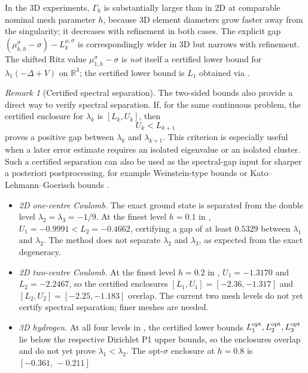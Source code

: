 \documentclass[11pt]{article}
\theoremstyle{plain}
\theoremstyle{definition}
\theoremstyle{remark}
\newtheorem{remark}{Remark}
\begin{document}
In the 3D experiments, $\Gamma_h$ is substantially larger than in 2D
at comparable nominal mesh parameter $h$, because 3D element diameters
grow faster away from the singularity; it decreases with refinement in
both cases.
The explicit gap $(\mu_{k,h}^\sigma{-}\sigma)-L_k^{\mu,\sigma}$ is
correspondingly wider in 3D but narrows with refinement.
The shifted Ritz value $\mu_{1,h}^\sigma{-}\sigma$ is
\emph{not} itself a certified lower bound for $\lambda_1(-\Delta+V)$
on $\mathbb{R}^3$; the certified lower bound is $L_1$ obtained via
.

\begin{remark}[Certified spectral separation]
\label{rmk:numerical-separation}
The two-sided bounds also provide a direct way to verify spectral
separation.  If, for the same continuous problem, the certified enclosure
for $\lambda_k$ is
$[L_k,U_k]$, then
\[
  U_k < L_{k+1}
\]
proves a positive gap between $\lambda_k$ and $\lambda_{k+1}$.  This
criterion is especially useful when a later error estimate requires an
isolated eigenvalue or an isolated cluster.  Such a certified separation
can also be used as the spectral-gap input for sharper a posteriori
postprocessing, for example Weinstein-type bounds
\cite{WeinsteinStenger1972} or Kato--Lehmann--Goerisch bounds
\cite{Kato1949,Lehmann1963,Goerisch1986,BehnkeGoerisch1994}.
\begin{itemize}
\item \emph{2D one-centre Coulomb.}
  The exact ground state is separated from the double level
  $\lambda_2=\lambda_3=-1/9$.
  At the finest level $h=0.1$ in ,
  $U_1=-0.9991<L_2=-0.4662$, certifying a gap of at least
  $0.5329$ between $\lambda_1$ and $\lambda_2$.
  The method does not separate $\lambda_2$ and $\lambda_3$,
  as expected from the exact degeneracy.
\item \emph{2D two-centre Coulomb.}
  At the finest level $h=0.2$ in ,
  $U_1=-1.3170$ and $L_2=-2.2467$, so the certified enclosures
  $[L_1,U_1]=[-2.36,-1.317]$ and $[L_2,U_2]=[-2.25,-1.183]$ overlap.
  The current two mesh levels do not yet certify spectral separation;
  finer meshes are needed.
\item \emph{3D hydrogen.}
  At all four levels in , the certified
  lower bounds $L_1^{\rm opt},L_2^{\rm opt},L_3^{\rm opt}$ lie below
  the respective Dirichlet P1 upper bounds, so the enclosures overlap
  and do not yet prove $\lambda_1<\lambda_2$.
  The opt-$\sigma$ enclosure at $h=0.8$ is $[-0.361,\,-0.211]$

\end{itemize}
\end{remark}
\end{document}
